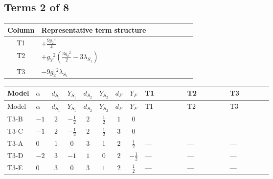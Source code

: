 \documentclass[8pt]{article}
\begin{document}
\begin{landscape}
\subsection*{Terms 2 of 8}
\begin{center}
\begin{tabular}{@{}c >{\raggedright\arraybackslash}p{0.82\linewidth}@{}}
\toprule
Column & Representative term structure \\
\midrule
T1 & \(\displaystyle +\frac{9 {g_2}^4}{4}\) \\
\midrule
T2 & \(\displaystyle +{g_Y}^2 \left(\frac{3 {g_2}^2}{2}-3 {\lambda_{S_1}}\right)\) \\
\midrule
T3 & \(\displaystyle -9 {g_2}^2 {\lambda_{S_1}}\) \\
\midrule
\bottomrule
\end{tabular}
\end{center}
\smallskip
\tiny
\begin{longtable}{@{}llcccccc >{\raggedright\arraybackslash}p{0.21\linewidth} >{\raggedright\arraybackslash}p{0.21\linewidth} >{\raggedright\arraybackslash}p{0.21\linewidth}@{}}
\toprule
Model & $\alpha$ & $d_{S_1}$ & $Y_{S_1}$ & $d_{S_2}$ & $Y_{S_2}$ & $d_F$ & $Y_F$ & T1 & T2 & T3 \\
\midrule
\endfirsthead
\toprule
Model & $\alpha$ & $d_{S_1}$ & $Y_{S_1}$ & $d_{S_2}$ & $Y_{S_2}$ & $d_F$ & $Y_F$ & T1 & T2 & T3 \\
\midrule
\endhead
T3-B & $-1$ & $2$ & $-\frac{1}{2}$ & $2$ & $\frac{1}{2}$ & $1$ & $0$ & \scriptsize\adjustbox{max width=\linewidth}{$\begin{gathered} +\frac{9 {g_2}^4}{4}\end{gathered}$} & \scriptsize\adjustbox{max width=\linewidth}{$\begin{gathered} +{g_Y}^2 \left(\frac{3 {g_2}^2}{2}-3 {\lambda_{S_1}}\right)\end{gathered}$} & \scriptsize\adjustbox{max width=\linewidth}{$\begin{gathered} -9 {g_2}^2 {\lambda_{S_1}}\end{gathered}$} \\
\midrule
T3-C & $-1$ & $2$ & $-\frac{1}{2}$ & $2$ & $\frac{1}{2}$ & $3$ & $0$ & \scriptsize\adjustbox{max width=\linewidth}{$\begin{gathered} +\frac{9 {g_2}^4}{4}\end{gathered}$} & \scriptsize\adjustbox{max width=\linewidth}{$\begin{gathered} +{g_Y}^2 \left(\frac{3 {g_2}^2}{2}-3 {\lambda_{S_1}}\right)\end{gathered}$} & \scriptsize\adjustbox{max width=\linewidth}{$\begin{gathered} -9 {g_2}^2 {\lambda_{S_1}}\end{gathered}$} \\
\midrule
T3-A & $0$ & $1$ & $0$ & $3$ & $1$ & $2$ & $\frac{1}{2}$ & --- & --- & --- \\
\midrule
T3-D & $-2$ & $3$ & $-1$ & $1$ & $0$ & $2$ & $-\frac{1}{2}$ & --- & --- & --- \\
\midrule
T3-E & $0$ & $3$ & $0$ & $3$ & $1$ & $2$ & $\frac{1}{2}$ & --- & --- & --- \\
\midrule
\bottomrule
\end{longtable}
\clearpage

\end{landscape}
\end{document}
